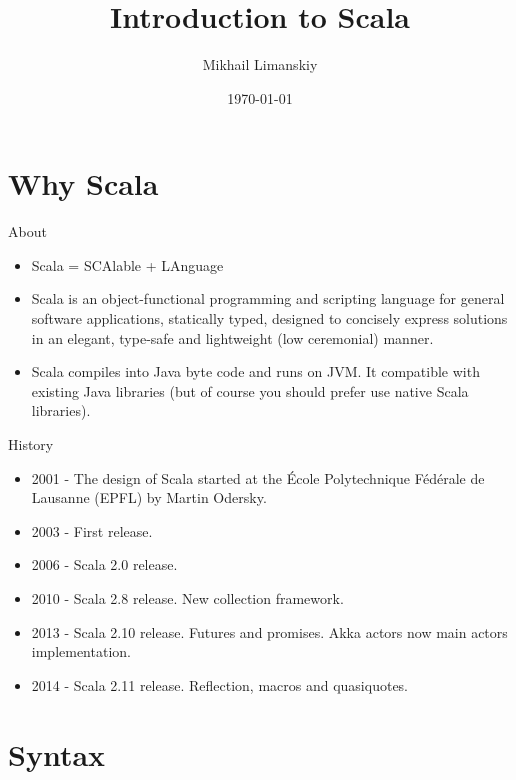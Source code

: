 \documentclass{beamer}
\title{Introduction to Scala}
\author{Mikhail Limanskiy}
\institute{SymphonyTeleca}
\date{\today}
\begin{document}
\begin{frame}
    \titlepage
\end{frame}

\section{Why Scala}

\begin{frame}{About}

\begin{itemize}
  \item Scala = SCAlable + LAnguage

  \item Scala is an object-functional programming and scripting language for general software applications, statically typed, designed to concisely express solutions in an elegant, type-safe and lightweight (low ceremonial) manner.

  \item Scala compiles into Java byte code and runs on JVM. It compatible with existing Java libraries (but of course you should prefer use native Scala libraries).
\end{itemize}

\end{frame}

\begin{frame}{History}

\begin{itemize}
  \item 2001 - The design of Scala started at the École Polytechnique Fédérale de Lausanne (EPFL) by Martin Odersky.
  \item 2003 - First release.
  \item 2006 - Scala 2.0 release.
  \item 2010 - Scala 2.8 release. New collection framework.
  \item 2013 - Scala 2.10 release. Futures and promises. Akka actors now main actors implementation.
  \item 2014 - Scala 2.11 release. Reflection, macros and quasiquotes.
\end{itemize}
\end{frame}

\section{Syntax}
\end{document}
